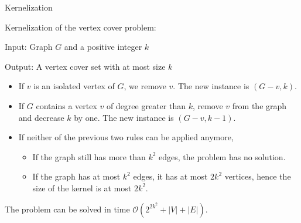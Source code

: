 \documentclass{beamer}
\begin{document}
\begin{frame}{Kernelization}
\begin{example}
Kernelization of the vertex cover problem:

Input: Graph $G$ and a positive integer $k$ 

Output: A vertex cover set with at most size $k$


\begin{itemize}
\item If $v$ is an isolated vertex of $G$, we remove $v$. The new instance is $(G - v , k)$.


\item If $G$ contains a vertex $v$ of degree greater than $k$, remove $v$ from the graph and decrease $k$ by one. The new instance is $(G - v , k - 1)$.

\item If neither of the previous two rules can be applied anymore,
\begin{itemize}
\item If the graph still has more than $k^2$ edges, the problem has no solution.

\item If the graph has at most $k^2$ edges, it has at most $2 k^2$ vertices, hence the size of the kernel is at most $2 k^2$.
\end{itemize}

  
\end{itemize}



The problem can be solved in time $\mathcal{O}(2^{2k^2} + |V| + |E|)$.
\end{example}
\end{frame}
\end{document}
